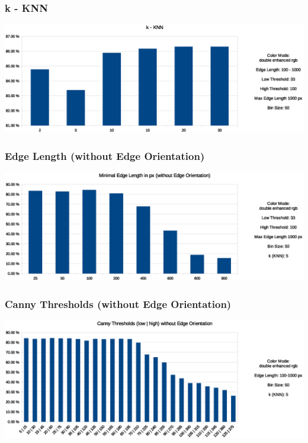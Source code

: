 \documentclass{beamer}
\begin{document}
\begin{frame}
	\frametitle{k - KNN}
    \begin{center}
    \includegraphics[width=\textwidth]{k.eps}
    \end{center}
\end{frame}

\begin{frame}
	\frametitle{Edge Length (without Edge Orientation)}
    \begin{center}
    \includegraphics[width=\textwidth]{lengths_without_orient.eps}
    \end{center}
\end{frame}

\begin{frame}
	\frametitle{Canny Thresholds (without Edge Orientation)}
    \begin{center}
    \includegraphics[width=\textwidth]{thresholds_without_orient.eps}
    \end{center}
\end{frame}
\end{document}
